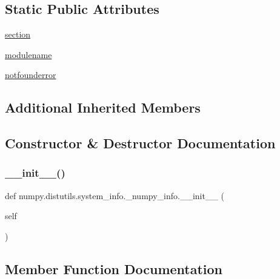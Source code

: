 \subsection*{Static Public Attributes}
\begin{DoxyCompactItemize}
\item 
\hyperlink{classnumpy_1_1distutils_1_1system__info_1_1__numpy__info_a2bbde9242ecc80ad4cc154f62f6e7e6a}{section}
\item 
\hyperlink{classnumpy_1_1distutils_1_1system__info_1_1__numpy__info_a19dba155a18442d080feaf1a8970b37f}{modulename}
\item 
\hyperlink{classnumpy_1_1distutils_1_1system__info_1_1__numpy__info_ad78baa02d6ec39ce7c1e1c4e845ddcfc}{notfounderror}
\end{DoxyCompactItemize}
\subsection*{Additional Inherited Members}


\subsection{Constructor \& Destructor Documentation}
\mbox{\label{classnumpy_1_1distutils_1_1system__info_1_1__numpy__info_a3d77b52b84e51d0e0c7730d45914dcaf}} 
\subsubsection{\texorpdfstring{\+\_\+\+\_\+init\+\_\+\+\_\+()}{\_\_init\_\_()}}
{\footnotesize\ttfamily def numpy.\+distutils.\+system\+\_\+info.\+\_\+numpy\+\_\+info.\+\_\+\+\_\+init\+\_\+\+\_\+ (\begin{DoxyParamCaption}\item[{}]{self }\end{DoxyParamCaption})}



\subsection{Member Function Documentation}
\mbox{\label{classnumpy_1_1distutils_1_1system__info_1_1__numpy__info_a7a0ebb3a4c0d63f690f63371d05f80bd}} 
